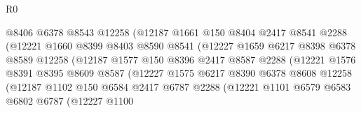 \begin{lexlean}{R0}
\begin{coremodule}
                              @8406
                              @6378
                              @8543
                              @12258
                              (@12187
                                @1661
                                @150
                                @8404
                                @2417
                                @8541
                                @2288
                                (@12221
                                  @1660
                                  @8399
                                  @8403
                                  @8590
                                  @8541
                                  (@12227
                                    @1659
                                    @6217
                                    @8398
                                    @6378
                                    @8589
                                    @12258
                                    (@12187
                                      @1577
                                      @150
                                      @8396
                                      @2417
                                      @8587
                                      @2288
                                      (@12221
                                        @1576
                                        @8391
                                        @8395
                                        @8609
                                        @8587
                                        (@12227
                                          @1575
                                          @6217
                                          @8390
                                          @6378
                                          @8608
                                          @12258
                                          (@12187
                                            @1102
                                            @150
                                            @6584
                                            @2417
                                            @6787
                                            @2288
                                            (@12221
                                              @1101
                                              @6579
                                              @6583
                                              @6802
                                              @6787
                                              (@12227
                                                @1100

\end{coremodule}
\end{lexlean}
